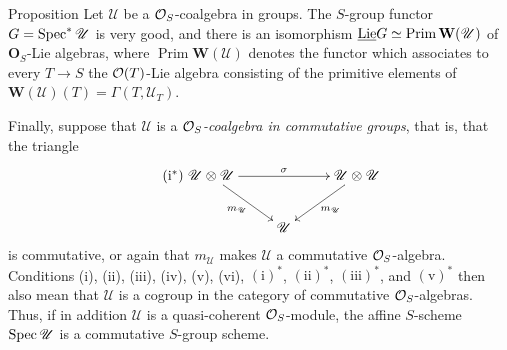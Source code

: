 \begin{enonce}{Proposition}{}
Let $\mathscr U$ be a $\mathcal{O}_S$-coalgebra in groups. The $S$-group functor $G=\operatorname{Spec}^*\mathscr U$ is very good, and there is an isomorphism $\underline{\operatorname{Lie}} G\simeq\operatorname{Prim}\mathbf W(\mathscr U)$ of $\mathbf O_S$-Lie algebras, where $\operatorname{Prim}\mathbf W(\mathscr U)$ denotes the functor which associates to every $T\to S$ the $\mathcal{O}(T)$-Lie algebra consisting of the primitive elements of $\mathbf W(\mathscr U)(T)=\Gamma(T,\mathscr U_T)$.
\end{enonce}

Finally, suppose that $\mathscr U$ is a \emph{$\mathcal{O}_S$-coalgebra in commutative groups}, that is, that the triangle
\begin{equation}\tag{$\mathrm{i}^*$}
\xymatrix{\mathscr U\otimes\mathscr U\ar[rr]^\sigma\ar[dr]_{m_{\mathscr U}}&&\mathscr U\otimes\mathscr U\ar[dl]^{m_{\mathscr U}}\\&\mathscr U&}
\end{equation}
is commutative, or again that $m_{\mathscr U}$ makes $\mathscr U$ a commutative $\mathcal{O}_S$-algebra. Conditions (i), (ii), (iii), (iv), (v), (vi), $(\mathrm{i})^*$, $(\mathrm{ii})^*$, $(\mathrm{iii})^*$, and $(\mathrm{v})^*$ then also mean that $\mathscr U$ is a cogroup in the category of commutative $\mathcal{O}_S$-algebras. Thus, if in addition $\mathscr U$ is a quasi-coherent $\mathcal{O}_S$-module, the affine $S$-scheme $\operatorname{Spec}\mathscr U$ is a commutative $S$-group scheme.

